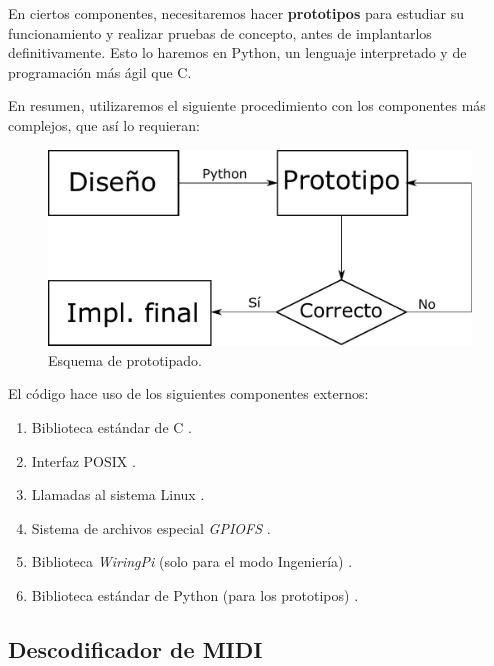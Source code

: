 En ciertos componentes, necesitaremos hacer \textbf{prototipos} para estudiar su funcionamiento y realizar pruebas de concepto, antes de implantarlos definitivamente. Esto lo haremos en Python, un lenguaje interpretado y de programación más ágil que C.

En resumen, utilizaremos el siguiente procedimiento con los componentes más complejos, que así lo requieran:

\smallskip

\begin{figure}[H]
	\noindent \begin{centering}
		\includegraphics[width=\linewidth/2]{capitulo5/prototipado}
		\par\end{centering}
	\smallskip
	\caption{\label{fig:prototipado} Esquema de prototipado.}
\end{figure} 

\smallskip

El código hace uso de los siguientes componentes externos:

\begin{enumerate}
	\item Biblioteca estándar de C \cite{cplusplus}.
	\item Interfaz \acrshort{POSIX} \cite{wiki_posix}.
	\item Llamadas al sistema Linux \cite{manpages}.
	\item Sistema de archivos especial \textit{GPIOFS} \cite{gpiofs}.
	\item Biblioteca \textit{WiringPi} (solo para el modo Ingeniería) \cite{wiringpi}.
	\item Biblioteca estándar de Python (para los prototipos) \cite{python}.
\end{enumerate}

\subsection{Descodificador de MIDI}

